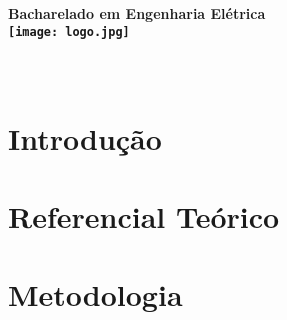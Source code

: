 \documentclass[
	12pt,				%
	openright,			%
	oneside,
	a4paper,
	english,			%
	french,				%
	spanish,			%
	brazil,				%
	]{abntex2}
\begin{document}
\begin{titlingpage}
    \centering
    \vfill
    {\bfseries\Large
        Bacharelado em Engenharia Elétrica\\
        \texttt{[image: logo.jpg]}
        \vskip2cm
        \imprimirautor\\
        \vspace{2.5cm}
        \huge 
       \imprimirtitulo\\[1cm]
    }
    \vfill
    \vfill
    \vfill
    \Large
    \imprimirlocal\\
    \imprimirdata
\end{titlingpage}


\frenchspacing 

\imprimirfolhaderosto

\tableofcontents*
\cleardoublepage

\textual

\chapter[Introdução]{Introdução}\label{cap:introducao}



\chapter[Referencial Teórico]{Referencial Teórico}\label{cap:referencial}


\chapter[Metodologia]{Metodologia}\label{cap:metodologia}





\postextual



\end{document}

